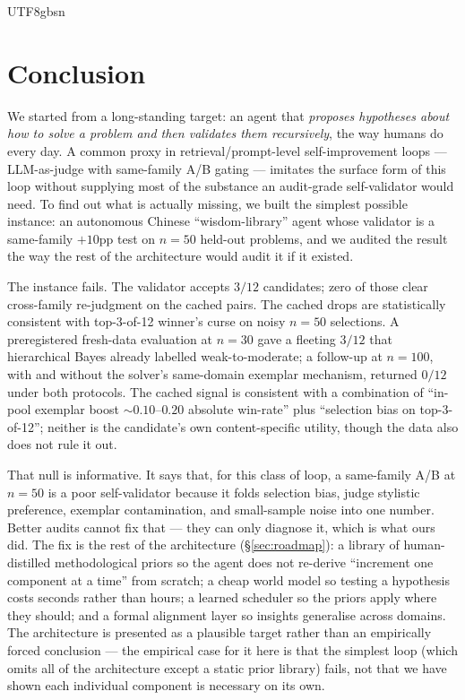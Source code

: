 \documentclass{article}
\begin{document}
\begin{CJK*}{UTF8}{gbsn}
\section{Conclusion}
\label{sec:conclusion}

We started from a long-standing target: an agent that
\emph{proposes hypotheses about how to solve a problem and then
validates them recursively}, the way humans do every day. A
common proxy in retrieval/prompt-level self-improvement loops
--- LLM-as-judge with same-family A/B gating --- imitates the
surface form of this loop without supplying most of the
substance an audit-grade self-validator would need. To find out what is actually missing, we built
the simplest possible instance: an autonomous Chinese
``wisdom-library'' agent whose validator is a same-family
\(+10\)pp test on \(n=50\) held-out problems, and we audited
the result the way the rest of the architecture would audit it
if it existed.

The instance fails. The validator accepts \(3/12\) candidates;
zero of those clear cross-family re-judgment on the cached
pairs. The cached drops are statistically consistent with
top-3-of-12 winner's curse on noisy \(n=50\) selections. A
preregistered fresh-data evaluation at \(n=30\) gave a fleeting
\(3/12\) that hierarchical Bayes already labelled
weak-to-moderate; a follow-up at \(n=100\), with and without the
solver's same-domain exemplar mechanism, returned \(0/12\) under
both protocols. The cached signal is consistent with a
combination of ``in-pool exemplar boost \(\sim 0.10\)--\(0.20\)
absolute win-rate'' plus ``selection bias on top-3-of-12'';
neither is the candidate's own content-specific utility, though
the data also does not rule it out.

That null is informative. It says that, for this class of
loop, a same-family A/B at \(n=50\) is a poor self-validator
because it folds selection bias, judge stylistic preference,
exemplar contamination, and small-sample noise into one number. Better
audits cannot fix that --- they can only diagnose it, which is
what ours did. The fix is the rest of the architecture
(\S\ref{sec:roadmap}): a library of human-distilled
methodological priors so the agent does not re-derive
``increment one component at a time'' from scratch; a cheap
world model so testing a hypothesis costs seconds rather than
hours; a learned scheduler so the priors apply where they
should; and a formal alignment layer so insights generalise
across domains. The architecture is presented as a plausible
target rather than an empirically forced conclusion --- the
empirical case for it here is that the simplest loop (which
omits all of the architecture except a static prior library)
fails, not that we have shown each individual component is
necessary on its own.


\end{CJK*}
\end{document}
